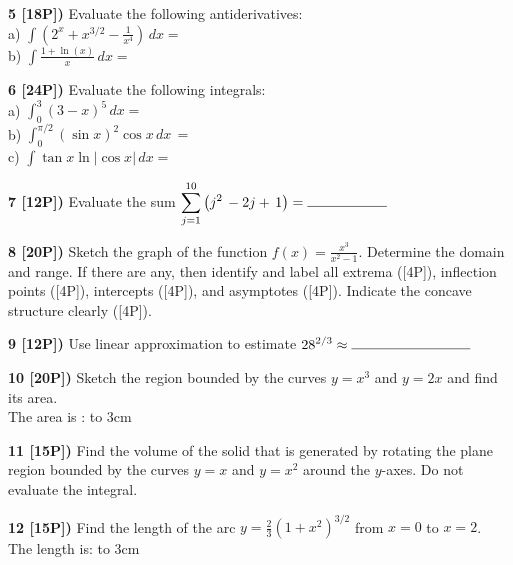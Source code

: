 \documentclass[12pt]{article}
\begin{document}
\vspace{.25in}

{\bf 5 [18P])}  Evaluate the following antiderivatives:
\\ 
a) 
$\displaystyle{\int \left( 2^x + x^{3/2} - \frac{1}{x^4}
\right)\, dx =}$
\\

b) $\displaystyle{\int \frac{1 + \ln (x)}{x} \, dx=}$

\vspace{.25in}

{\bf 6 [24P])} Evaluate the following integrals:
\\ 

a)  $\displaystyle{\int_{0}^3 (3 - x)^5\, dx =}$
\\

b) ${ \int_0^{\pi /2} (\sin x)^2 \cos x\, dx\, = }$
\\

c) $\displaystyle{\int \tan x \ln |\cos x| \, dx=}$
\vspace{.25in}

{\bf 7 [12P])} Evaluate the sum $ 
\displaystyle{\sum_{j=1}^{10}\left( j^2\,-2j  +\, 1\right) =
\hbox  to 2cm{\hrulefill}}$

\vspace{.25in}

{\bf 8 [20P])} Sketch the graph of the function
${\displaystyle f(x) = \frac{x^3}{x^2-1}}$. Determine the domain and
range. If there are any, then identify and label all
extrema ([4P]), inflection points ([4P]), intercepts
([4P]), and asymptotes ([4P]). Indicate the concave structure
clearly ([4P]).

\vspace{.25in}


{\bf 9 [12P])}
Use linear approximation to estimate
$\displaystyle{28^{2/3}\approx\hbox  to 3cm{\hrulefill} }$

\vspace{.25in}

{\bf 10 [20P])} Sketch the region bounded by the curves
$\displaystyle{y=x^3}$ and ${\displaystyle y =  2x}$ and find its area.
\\

The area is : \hbox  to 3cm{\hrulefill}


\vspace{.25in}

{\bf 11 [15P])} Find the volume of the solid that is generated
by rotating the plane region bounded
by the curves  $\displaystyle{y= x}$ and
${\displaystyle y =  x^2}$  around the $y$-axes.
Do not evaluate the integral.
\\


\vspace{.25in}

{\bf 12 [15P])} Find the length of the arc
$\displaystyle{y = \frac{2}{3}\left(1 + x^2\right)^{3/2}}$
from $\displaystyle{x=0}$ to $\displaystyle{x = 2}$.
\\

The length is: \hbox  to 3cm{\hrulefill}

\vspace{.25in}
\end{document}
